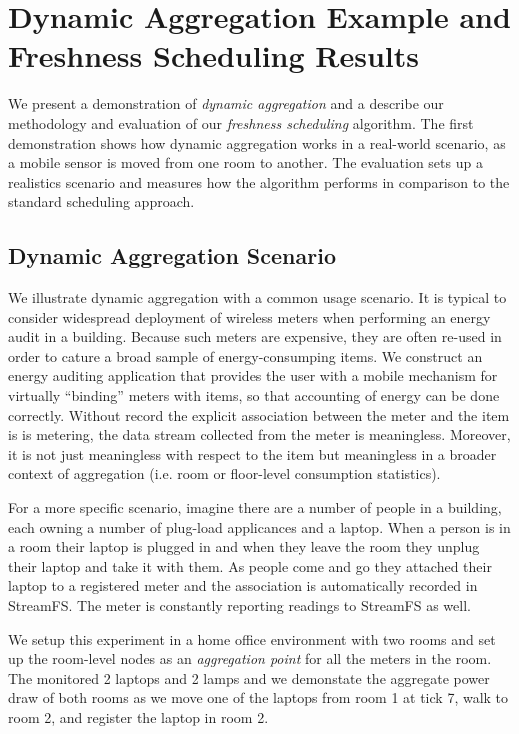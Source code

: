 \section{Dynamic Aggregation Example and Freshness Scheduling Results}


We present a demonstration of \emph{dynamic aggregation} and a describe our methodology and evaluation of
our \emph{freshness scheduling} algorithm.  The first demonstration shows how dynamic aggregation works in a real-world
scenario, as a mobile sensor is moved from one room to another.  The evaluation sets up a realistics scenario and
measures how the algorithm performs in comparison to the standard scheduling approach.

\subsection{Dynamic Aggregation Scenario}
We illustrate dynamic aggregation with a common usage scenario.  It is typical to consider widespread deployment 
of wireless meters when performing an energy audit in a building.  Because such meters are expensive, they are often 
re-used in order to cature a broad sample of energy-consumping items.  We construct an energy auditing application
that provides the user with a mobile mechanism for virtually ``binding'' meters with items, so that accounting of
energy can be done correctly.  Without record the explicit association between the meter and the item is is metering, 
the data stream collected from the meter is meaningless.  Moreover, it is not just meaningless with respect to the item
but meaningless in a broader context of aggregation (i.e. room or floor-level consumption statistics).

For a more specific scenario, imagine there are a number of people in a building,
each owning a number of plug-load applicances and a laptop.  When a person is in a room their laptop
is plugged in and when they leave the room they unplug their laptop and take it with them.  As people come and go
they attached their laptop to a registered meter and the association is automatically recorded in StreamFS.
The meter is constantly reporting readings to StreamFS as well.  

We setup this experiment in a home office environment with two rooms
and set up the room-level nodes as an \emph{aggregation point} for all the meters in the room.  The monitored
2 laptops and 2 lamps and we demonstate the aggregate power draw of both rooms as we move one of the laptops from
room 1 at tick 7, walk to room 2, and register the laptop in room 2.


